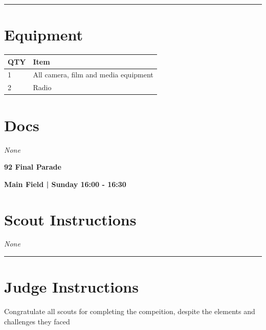 \documentclass[10pt]{article}
\newcommand{\newtitle}[1]{\begin{center}{\Huge\bfseries #1 }\\ \vspace{5mm}\end{center}}
\newcommand{\newsubtitle}[1]{\begin{center}{\color{grey}\Large\bfseries #1 }\\ \vspace{5mm}\end{center}}
\begin{document}
			\vspace{0.5cm}
	\hrule
	\vspace{0.5cm}

	\begin{multicols}{2}

		\section*{\faWrench \: Equipment}

		
	\begin{center}
			\begin{tabular}{p{2cm}p{4cm}}


				\textbf{QTY} & \textbf{Item} \\\toprule
												1&All camera, film and media equipment\\\midrule
												2&Radio\\\midrule
								\end{tabular}

			\end{center}

		
		\vfill\null
		\columnbreak

			\section*{\faFile \: Docs}
		 	\textit{None}
	

		\vfill\null

		\end{multicols}



	\vspace{1cm}


	\clearpage
		\newtitle{92 Final Parade }
	\newsubtitle{Main Field | Sunday 16:00 - 16:30}
		\setcounter{section}{91}
	\section*{Scout Instructions}
		\textit{None}
	
	\vspace{0.5cm}
	\hrule
	\vspace{0.5cm}

		\section*{Judge Instructions}
		Congratulate all scouts for completing the compeition, despite the elements and challenges they faced
\end{document}
